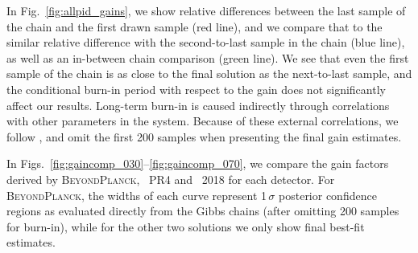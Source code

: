 \documentclass[twocolumn]{aa}
\newcommand{\BP}{\textsc{BeyondPlanck}}
\begin{document}


In Fig.~\ref{fig:allpid_gains}, we show relative differences between
the last sample of the chain and the first drawn sample (red line),
and we compare that to the similar relative difference with the
second-to-last sample in the chain (blue line), as well as an
in-between chain comparison (green line). We see that even the first
sample of the chain is as close to the final solution as the
next-to-last sample, and the conditional burn-in period with respect
to the gain does not significantly affect our results. Long-term
burn-in is caused indirectly through correlations with other
parameters in the system. Because of these external correlations, we
follow \citet{bp01}, and omit the first 200 samples when presenting the
final gain estimates.

In Figs.~\ref{fig:gaincomp_030}--\ref{fig:gaincomp_070}, we compare
the gain factors derived by \BP, \Planck\ PR4 and \Planck\ 2018 for each
detector. For \BP, the widths of each curve represent 1\,$\sigma$
posterior confidence regions as evaluated directly from the Gibbs
chains (after omitting 200 samples for burn-in), while for the other
two solutions we only show final best-fit estimates.
\end{document}
